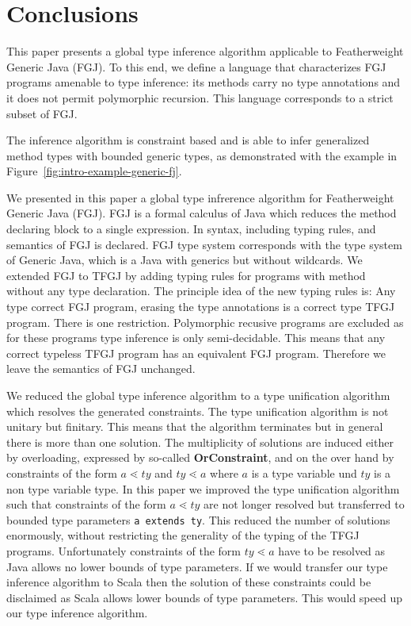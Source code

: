 \section{Conclusions}
\label{sec:conclusions}

This paper presents a global type inference algorithm applicable to
Featherweight Generic Java (FGJ). To this end, we define a language
\FGJGT that characterizes FGJ programs amenable to type inference: its
methods carry no type annotations and it does not permit polymorphic recursion.
This language corresponds to a strict subset of FGJ.

The inference algorithm is constraint based and is able to infer
generalized method types with bounded generic types, as demonstrated
with the example in Figure~\ref{fig:intro-example-generic-fj}.


We presented in this paper a global type infrerence algorithm for Featherweight
Generic Java (FGJ). FGJ is a formal calculus of Java which reduces the method
declaring block to a single expression. In
\cite{DBLP:journals/toplas/IgarashiPW01} syntax, including typing rules, and semantics of FGJ is
declared. FGJ type system corresponds with the type system of Generic Java, which is a Java with generics but without wildcards. We extended FGJ to TFGJ by adding typing rules for
programs with method without any type declaration. The principle idea of the
new typing rules is: Any type correct FGJ program, erasing the type
annotations is a correct type TFGJ program. There is one
restriction. Polymorphic recusive programs are excluded as for these programs
type inference is only semi-decidable. This means that any correct typeless TFGJ program
has an equivalent FGJ program. Therefore we leave the semantics of FGJ unchanged.

We reduced the global type inference algorithm to a type unification algorithm
which resolves the generated constraints. The type unification algorithm is not
unitary but finitary. This means that the algorithm terminates but in general
there is more than one solution. The multiplicity of solutions are induced
either by overloading, expressed by so-called \textbf{OrConstraint}, and on the over hand by constraints of the form $a
\lessdot ty$ and $ty \lessdot a$ where $a$ is a type variable und $ty$ is a non
type variable type. In this paper we improved the type unification algorithm
such that constraints of the form $a \lessdot ty$ are not longer resolved but
transferred to bounded type parameters \texttt{a extends ty}. This reduced the
number of solutions enormously, without restricting the generality of the typing
of the TFGJ programs. Unfortunately constraints of the form $ty \lessdot a$ have
to be resolved as Java allows no lower bounds of type parameters. If we would
transfer our type inference algorithm to Scala then the solution of these
constraints could be disclaimed as Scala allows lower bounds of type
parameters. This would speed up our type inference algorithm.
\fi

